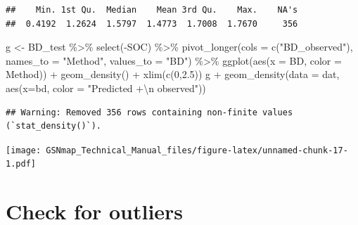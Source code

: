 \documentclass[
  10pt,
  b5paper,
  oneside]{book}
\newenvironment{Shaded}{\begin{snugshade}}{\end{snugshade}}
\newcommand{\AttributeTok}[1]{\textcolor[rgb]{0.77,0.63,0.00}{#1}}
\newcommand{\DecValTok}[1]{\textcolor[rgb]{0.00,0.00,0.81}{#1}}
\newcommand{\FloatTok}[1]{\textcolor[rgb]{0.00,0.00,0.81}{#1}}
\newcommand{\FunctionTok}[1]{\textcolor[rgb]{0.00,0.00,0.00}{#1}}
\newcommand{\NormalTok}[1]{#1}
\newcommand{\OtherTok}[1]{\textcolor[rgb]{0.56,0.35,0.01}{#1}}
\newcommand{\SpecialCharTok}[1]{\textcolor[rgb]{0.00,0.00,0.00}{#1}}
\newcommand{\StringTok}[1]{\textcolor[rgb]{0.31,0.60,0.02}{#1}}
\begin{document}
\begin{verbatim}
##    Min. 1st Qu.  Median    Mean 3rd Qu.    Max.    NA's 
##  0.4192  1.2624  1.5797  1.4773  1.7008  1.7670     356
\end{verbatim}

\begin{Shaded}
\begin{Highlighting}[]
\NormalTok{g }\OtherTok{\textless{}{-}}\NormalTok{ BD\_test }\SpecialCharTok{\%\textgreater{}\%} 
  \FunctionTok{select}\NormalTok{(}\SpecialCharTok{{-}}\NormalTok{SOC) }\SpecialCharTok{\%\textgreater{}\%} 
  \FunctionTok{pivot\_longer}\NormalTok{(}\AttributeTok{cols =} \FunctionTok{c}\NormalTok{(}\StringTok{"BD\_observed"}\NormalTok{), }
               \AttributeTok{names\_to =} \StringTok{"Method"}\NormalTok{, }\AttributeTok{values\_to =} \StringTok{"BD"}\NormalTok{) }\SpecialCharTok{\%\textgreater{}\%} 
  \FunctionTok{ggplot}\NormalTok{(}\FunctionTok{aes}\NormalTok{(}\AttributeTok{x =}\NormalTok{ BD, }\AttributeTok{color =}\NormalTok{ Method)) }\SpecialCharTok{+} 
  \FunctionTok{geom\_density}\NormalTok{() }\SpecialCharTok{+}
  \FunctionTok{xlim}\NormalTok{(}\FunctionTok{c}\NormalTok{(}\DecValTok{0}\NormalTok{,}\FloatTok{2.5}\NormalTok{))}
\NormalTok{g }\SpecialCharTok{+} \FunctionTok{geom\_density}\NormalTok{(}\AttributeTok{data =}\NormalTok{ dat, }\FunctionTok{aes}\NormalTok{(}\AttributeTok{x=}\NormalTok{bd, }\AttributeTok{color =} \StringTok{"Predicted +}\SpecialCharTok{\textbackslash{}n}\StringTok{ observed"}\NormalTok{))}
\end{Highlighting}
\end{Shaded}

\begin{verbatim}
## Warning: Removed 356 rows containing non-finite values (`stat_density()`).
\end{verbatim}

\texttt{[image: GSNmap\_Technical\_Manual\_files/figure-latex/unnamed-chunk-17-1.pdf]}

\hypertarget{check-for-outliers}{%
\section{Check for outliers}\label{check-for-outliers}}
\end{document}
